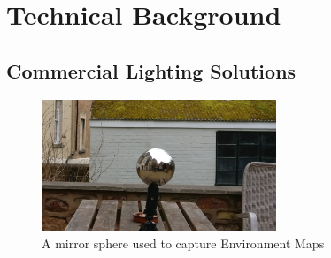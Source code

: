 \documentclass[ %
                    author={Gavin Parker},
                supervisor={Dr. Neill Campbell},
                    degree={MEng},
                     title={Deep Siamese Networks for Illumination Estimation from Stereo Images},
                  subtitle={},
                      type={research},
                      year={2018} ]{dissertation}
\begin{document}
\chapter{Technical Background}
\label{chap:technical}
\section{Commercial Lighting Solutions}
\begin{figure}[H] 
\centering 
\includegraphics[width=7cm]{images/envmap} 
\caption{A mirror sphere used to capture Environment Maps} 
\end{figure} 
\end{document}
